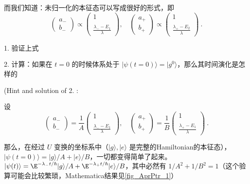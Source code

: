 \begin{exercise}{}
而我们知道：未归一化的本征态可以写成很好的形式，即
\begin{equation}
\left(\begin{matrix}a_-\\b_-\end{matrix}\right) \propto \left(\begin{matrix}1 \\ \ \\ \displaystyle\frac{\lambda_- - E_1}{\lambda}\end{matrix}\right),\quad \left(\begin{matrix}a_+\\b_+\end{matrix}\right) \propto \left(\begin{matrix}1 \\ \ \\ \displaystyle\frac{\lambda_+ - E_2}{\lambda}\end{matrix}\right)~.
\end{equation}

1. 验证上式

2. 计算：如果在 $t=0$ 的时候体系处于 $|\psi(t=0)\rangle = |g^0\rangle$，那么其时间演化是怎样的

(Hint and solution of 2. :

设
\begin{equation}
\left(\begin{matrix}a_-\\b_-\end{matrix}\right) =\frac{1}{A} \left(\begin{matrix}1 \\ \ \\ \displaystyle\frac{\lambda_- - E_1}{\lambda}\end{matrix}\right),\quad \left(\begin{matrix}a_+\\b_+\end{matrix}\right) =\frac{1}{B} \left(\begin{matrix}1 \\ \ \\ \displaystyle\frac{\lambda_+ - E_1}{\lambda}\end{matrix}\right) ~.
\end{equation}

那么，在经过 $U$ 变换的坐标系中（$|g\rangle,|e\rangle$ 是完整的Hamiltonian的本征态），$|\psi(t=0)\rangle = |g\rangle/A + |e\rangle/B$，一切都变得简单了起来。 $|\psi(t)\rangle = \E^{-\lambda_-t/\hbar}|g\rangle/A + \E^{-\lambda_+t/\hbar}|e\rangle/B$，其中必然有 $1/A^2 + 1/B^2 = 1$（这个验算可能会比较繁琐，Mathematica结果见\autoref{fig_AprPtr_1}）


\end{exercise}
